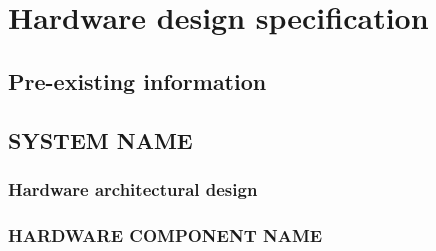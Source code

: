 \section{Hardware design specification}
%
%

\subsection{Pre-existing information}
%

\subsection{SYSTEM NAME}
\subsubsection{Hardware architectural design}
%
%
%
%

\subsubsection{HARDWARE COMPONENT NAME}
%
%
%
%


